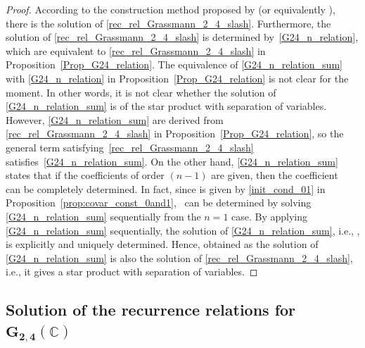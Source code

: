 \documentclass[pdftex]{sigma}
\numberwithin{equation}{section}
\begin{document}
\begin{proof}
According to the construction method proposed by \cite{HS1,HS2} (or equivalently \cite{SSU1,SSU2}), there is the solution
of \eqref{rec_rel_Grassmann_2_4_slash}.
Furthermore, the solution  of \eqref{rec_rel_Grassmann_2_4_slash} is determined by~\eqref{G24_n_relation}, which are equivalent to \eqref{rec_rel_Grassmann_2_4_slash} in Proposition~\ref{Prop_G24_relation}.
The equivalence of \eqref{G24_n_relation_sum} with \eqref{G24_n_relation} in Proposition~\ref{Prop_G24_relation} is not clear for the moment. In other words, it is not clear whether the solution of \eqref{G24_n_relation_sum} is  of the star product with separation of variables.
However, \eqref{G24_n_relation_sum} are derived from \eqref{rec_rel_Grassmann_2_4_slash} in Proposition~\ref{Prop_G24_relation}, so the general term  satisfying~\eqref{rec_rel_Grassmann_2_4_slash} satisfies~\eqref{G24_n_relation_sum}.
On the other hand, \eqref{G24_n_relation_sum} states that if the
coefficients of order $(n-1)$ are given, then the coefficient~ can be completely determined.
In fact, since  is given by \eqref{init_cond_01} in Proposi\-tion~\ref{prop:covar_const_0and1}, ~can be determined by solving \eqref{G24_n_relation_sum} sequentially from the $n=1$ case.
By applying \eqref{G24_n_relation_sum} sequentially, the solution of \eqref{G24_n_relation_sum}, i.e., , is explicitly and uniquely determined.
Hence,  obtained as the solution of \eqref{G24_n_relation_sum} is also the solution of \eqref{rec_rel_Grassmann_2_4_slash}, i.e., it gives a star product with separation of variables.
\end{proof}

\subsection[Solution of the recurrence relations for G\_\{2,4\}(C)]{Solution of the recurrence relations for $\boldsymbol{G_{2,4}(\mathbb{C})}$}
\label{G24_recrel_solve}
\end{document}
